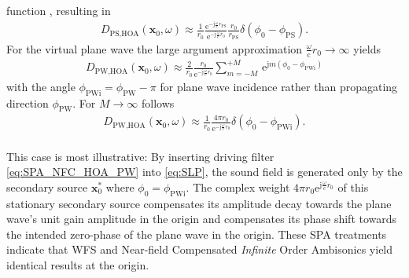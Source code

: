 \documentclass[a4paper, 10pt, twocolumn]{article}
\def\NewL{\\\noindent\hspace*{3mm}}
\begin{document}
function \cite[Sec. 1.15]{Arfken}, resulting in
\begin{align}
D_{\text{PS,HOA}}(\mathbf{x}_0,\omega) \approx
\frac{1}{r_0}
\frac
{\mathrm{e}^{-\mathrm{j} \frac{\omega}{\mathrm{c}} r_\text{PS}}}
{\mathrm{e}^{-\mathrm{j} \frac{\omega}{\mathrm{c}} r_0}}
\frac{r_0}{r_\text{PS}}
\delta(\phi_0 - \phi_\text{PS}).
\end{align}
For the virtual plane wave the large argument approximation 
$\frac{\omega}{\mathrm{c}} r_0 \rightarrow \infty$
yields
\begin{align}
D_{\text{PW,HOA}}(\mathbf{x}_0,\omega) \approx
\frac{2}{r_0} \frac{r_0}{\mathrm{e}^{-\mathrm{j} \frac{\omega}{\mathrm{c}} r_0}}
\sum\limits_{m=-M}^{+M} \, \mathrm{e}^{\mathrm{j} m (\phi_0 - \phi_\text{PWi})}
\end{align}
with the angle $\phi_\text{PWi} = \phi_\text{PW} - \pi$ for plane wave incidence rather
than propagating direction $\phi_\text{PW}$.
%
For $M\rightarrow \infty$ follows
\begin{align}
\label{eq:SPA_NFC_HOA_PW}
D_{\text{PW,HOA}}(\mathbf{x}_0,\omega) \approx
\frac{1}{r_0} \frac{4 \pi r_0}{\mathrm{e}^{-\mathrm{j} \frac{\omega}{\mathrm{c}} r_0}}
\delta(\phi_0 - \phi_\text{PWi}).
\end{align}
%
%
%
%
\NewL This case is most illustrative: By inserting driving filter 
\eqref{eq:SPA_NFC_HOA_PW} into \eqref{eq:SLP}, the sound field is generated
only by the secondary source $\mathbf{x}_0^*$ where $\phi_0 = \phi_\text{PWi}$.
The complex weight 
$4 \pi r_0 \mathrm{e}^{\mathrm{j} \frac{\omega}{\mathrm{c}} r_0}$
of this stationary secondary source compensates its amplitude decay 
towards the plane wave's unit gain amplitude in the origin and compensates its phase
shift towards the intended zero-phase of the plane wave in the origin.
%
These SPA treatments indicate that WFS and
Near-field Compensated \textit{Infinite} Order Ambisonics
 yield identical results at the origin.
%
%
%

%
%
%
\end{document}
